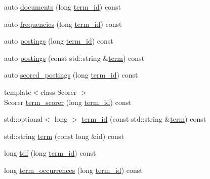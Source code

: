 \begin{DoxyCompactItemize}
\item 
auto \mbox{\hyperlink{classirk_1_1v2_1_1inverted__index__view_ab53148e1e271e643013d61f7c815a96d}{documents}} (long \mbox{\hyperlink{classirk_1_1v2_1_1inverted__index__view_aa2dd69651e8d1f90218ff5daabbbe0ab}{term\+\_\+id}}) const
\item 
auto \mbox{\hyperlink{classirk_1_1v2_1_1inverted__index__view_ab09742f5b4edb14da6188e0db717ce06}{frequencies}} (long \mbox{\hyperlink{classirk_1_1v2_1_1inverted__index__view_aa2dd69651e8d1f90218ff5daabbbe0ab}{term\+\_\+id}}) const
\item 
auto \mbox{\hyperlink{classirk_1_1v2_1_1inverted__index__view_af1e3ff71d96f699e0405bdf30598fede}{postings}} (long \mbox{\hyperlink{classirk_1_1v2_1_1inverted__index__view_aa2dd69651e8d1f90218ff5daabbbe0ab}{term\+\_\+id}}) const
\item 
auto \mbox{\hyperlink{classirk_1_1v2_1_1inverted__index__view_ac5232b49a6da53394d0cee20ee7c04e9}{postings}} (const std\+::string \&\mbox{\hyperlink{classirk_1_1v2_1_1inverted__index__view_a7c84123ec294a4a533331f316a3ba2e3}{term}}) const
\item 
auto \mbox{\hyperlink{classirk_1_1v2_1_1inverted__index__view_afb4c98e6d2a700089ebec040544116e5}{scored\+\_\+postings}} (long \mbox{\hyperlink{classirk_1_1v2_1_1inverted__index__view_aa2dd69651e8d1f90218ff5daabbbe0ab}{term\+\_\+id}}) const
\item 
{\footnotesize template$<$class Scorer $>$ }\\Scorer \mbox{\hyperlink{classirk_1_1v2_1_1inverted__index__view_afa7ed76022fafa732e52043a5ffb7428}{term\+\_\+scorer}} (long \mbox{\hyperlink{classirk_1_1v2_1_1inverted__index__view_aa2dd69651e8d1f90218ff5daabbbe0ab}{term\+\_\+id}}) const
\item 
std\+::optional$<$ long $>$ \mbox{\hyperlink{classirk_1_1v2_1_1inverted__index__view_aa2dd69651e8d1f90218ff5daabbbe0ab}{term\+\_\+id}} (const std\+::string \&\mbox{\hyperlink{classirk_1_1v2_1_1inverted__index__view_a7c84123ec294a4a533331f316a3ba2e3}{term}}) const
\item 
std\+::string \mbox{\hyperlink{classirk_1_1v2_1_1inverted__index__view_a7c84123ec294a4a533331f316a3ba2e3}{term}} (const long \&id) const
\item 
long \mbox{\hyperlink{classirk_1_1v2_1_1inverted__index__view_af0ca55da7d671601d894169d2a88693b}{tdf}} (long \mbox{\hyperlink{classirk_1_1v2_1_1inverted__index__view_aa2dd69651e8d1f90218ff5daabbbe0ab}{term\+\_\+id}}) const
\item 
long \mbox{\hyperlink{classirk_1_1v2_1_1inverted__index__view_a155b3ff8825b4f000ff51216ef508dea}{term\+\_\+occurrences}} (long \mbox{\hyperlink{classirk_1_1v2_1_1inverted__index__view_aa2dd69651e8d1f90218ff5daabbbe0ab}{term\+\_\+id}}) const

\end{DoxyCompactItemize}
